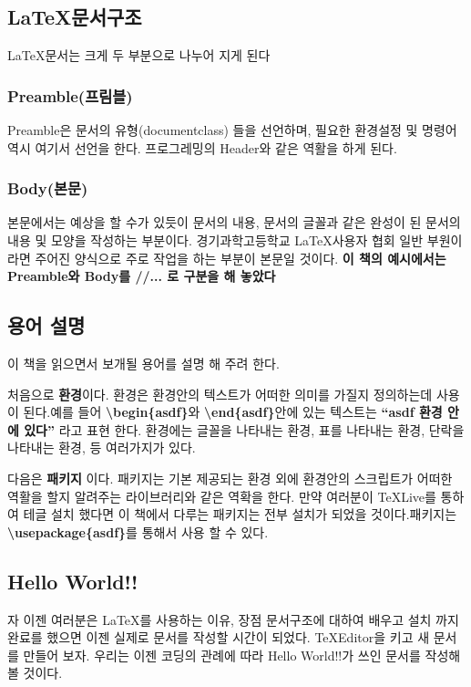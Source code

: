 \documentclass[12pt]{article}
\begin{document}
	\subsection{\LaTeX 문서구조}
	\LaTeX 문서는 크게 두 부분으로 나누어 지게 된다
	\subsubsection{Preamble(프림블)}
	Preamble은 문서의 유형(documentclass) 들을 선언하며, 필요한 환경설정 및 명령어 역시 여기서 선언을 한다. 프로그레밍의 Header와 같은 역활을 하게 된다.
	\subsubsection{Body(본문)}
	본문에서는 예상을 할 수가 있듯이 문서의 내용, 문서의 글꼴과 같은 완성이 된 문서의 내용 및 모양을 작성하는 부분이다. 경기과학고등학교  \LaTeX 사용자 협회 일반 부원이라면 주어진 양식으로 주로 작업을 하는 부분이 본문일 것이다.
	\newline
	\newline
	{\bf 이 책의 예시에서는 Preamble와 Body를 //... 로 구분을 해 놓았다}
	\subsection{용어 설명}
	이 책을 읽으면서 보개될 용어를 설명 해 주려 한다.
	
	처음으로 \textbf{환경}이다. 환경은 환경안의 텍스트가 어떠한 의미를 가질지 정의하는데 사용이 된다.예를 들어 \textbf{\textbackslash begin\{asdf\}}와 \textbf{\textbackslash end\{asdf\}}안에 있는 텍스트는 \textbf{``asdf 환경 안에 있다''} 라고 표현 한다. 환경에는 글꼴을 나타내는 환경, 표를 나타내는 환경, 단락을 나타내는 환경, 등 여러가지가 있다.
	
	다음은 \textbf{패키지} 이다. 패키지는 기본 제공되는  환경 외에 환경안의 스크립트가 어떠한 역활을 할지 알려주는 라이브러리와 같은 역확을 한다. 만약 여러분이 \TeX Live를 통하여 테글 설치 했다면 이 책에서 다루는 패키지는 전부 설치가 되었을 것이다.패키지는 \textbf{\textbackslash usepackage\{asdf\}}를 통해서 사용 할 수 있다.
	\clearpage
	\subsection{Hello World!!}
	자 이젠 여러분은 \LaTeX 를 사용하는 이유, 장점 문서구조에 대하여 배우고 설치 까지 완료를 했으면 이젠 실제로 문서를 작성할 시간이 되었다. \TeX Editor을 키고 새 문서를 만들어 보자. 우리는 이젠 코딩의 관례에 따라 Hello World!!가 쓰인 문서를 작성해 볼 것이다.\newline
	
\end{document}
